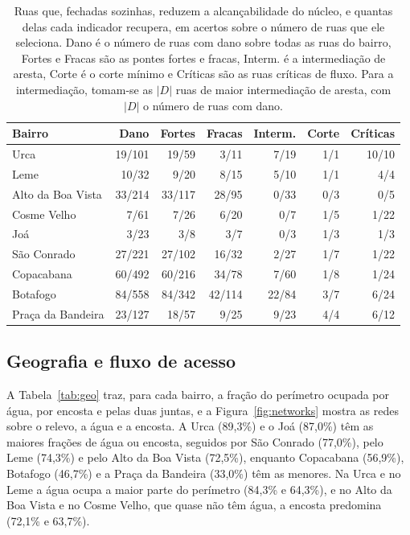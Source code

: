 \begin{table}[tbp]
\centering
\caption{Ruas que, fechadas sozinhas, reduzem a alcançabilidade do núcleo, e
quantas delas cada indicador recupera, em acertos sobre o número de ruas que
ele seleciona. Dano é o número de ruas com dano sobre todas as ruas do bairro, Fortes e
Fracas são as pontes fortes e fracas, Interm. é a intermediação de aresta,
Corte é o corte mínimo e Críticas são as ruas críticas de fluxo. Para a intermediação, tomam-se as $|D|$ ruas de maior intermediação de
aresta, com $|D|$ o número de ruas com dano.}
\label{tab:dano}
\small
\setlength{\tabcolsep}{4pt}
\begin{tabular}{lrrrrrr}
\toprule
Bairro & Dano & Fortes & Fracas & Interm. & Corte & Críticas \\
\midrule
Urca              & 19/101  & 19/59  & 3/11  & 7/19  & 1/1 & 10/10 \\
Leme              & 10/32   & 9/20   & 8/15  & 5/10  & 1/1 & 4/4 \\
Alto da Boa Vista & 33/214  & 33/117 & 28/95 & 0/33  & 0/3 & 0/5 \\
Cosme Velho       & 7/61    & 7/26   & 6/20  & 0/7   & 1/5 & 1/22 \\
Joá               & 3/23    & 3/8    & 3/7   & 0/3   & 1/3 & 1/3 \\
São Conrado       & 27/221  & 27/102 & 16/32 & 2/27  & 1/7 & 1/22 \\
Copacabana        & 60/492  & 60/216 & 34/78 & 7/60  & 1/8 & 1/24 \\
Botafogo          & 84/558  & 84/342 & 42/114 & 22/84 & 3/7 & 6/24 \\
Praça da Bandeira & 23/127  & 18/57  & 9/25  & 9/23  & 4/4 & 6/12 \\
\bottomrule
\end{tabular}
\end{table}

\subsection{Geografia e fluxo de acesso}
\label{sec:res-geo}

A Tabela~\ref{tab:geo} traz, para cada bairro, a fração do perímetro ocupada
por água, por encosta e pelas duas juntas, e a Figura~\ref{fig:networks} mostra
as redes sobre o relevo, a água e a encosta. A Urca (89,3\%) e o Joá (87,0\%)
têm as maiores frações de água ou encosta, seguidos por São Conrado (77,0\%),
pelo Leme (74,3\%) e pelo Alto da Boa Vista (72,5\%), enquanto Copacabana
(56,9\%), Botafogo (46,7\%) e a Praça da Bandeira (33,0\%) têm as menores. Na
Urca e no Leme a água ocupa a maior parte do perímetro (84,3\% e 64,3\%), e no
Alto da Boa Vista e no Cosme Velho, que quase não têm água, a encosta
predomina (72,1\% e 63,7\%).

